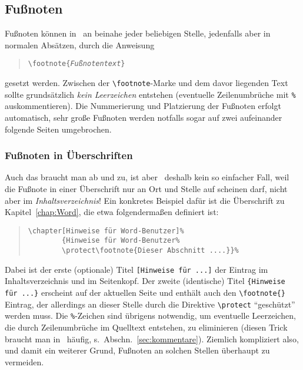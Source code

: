 \subsection{Fußnoten}
Fußnoten können in \latex\ an beinahe jeder beliebigen Stelle,
jedenfalls aber in normalen Absätzen, durch die Anweisung
%
\begin{quote}
\verb!\footnote{!\texttt{\em Fußnotentext}\verb!}!
\end{quote}
%
gesetzt werden. Zwischen der \verb!\footnote!-Marke und dem davor
liegenden Text sollte grundsätzlich \emph{kein Leerzeichen} entstehen (eventuelle
Zeilen\-um\-brüche mit \verb!%! auskommentieren).
Die Nummerierung und Platzierung der Fußnoten
erfolgt automatisch, sehr große Fußnoten werden notfalls sogar auf
zwei aufeinander folgende Seiten umgebrochen.


\subsubsection{Fußnoten in Überschriften}

Auch das braucht man ab und zu, ist aber \va\ deshalb kein so
einfacher Fall, weil die Fußnote in einer Überschrift nur an Ort
und Stelle auf scheinen darf, nicht aber im \emph{Inhaltsverzeichnis}! Ein
konkretes Beispiel dafür ist die Überschrift zu
Kapitel~\ref{chap:Word}, die etwa folgendermaßen definiert ist:
%
\begin{quote}
\begin{verbatim}
\chapter[Hinweise für Word-Benutzer]%
        {Hinweise für Word-Benutzer%
        \protect\footnote{Dieser Abschnitt ....}}%
\end{verbatim}
\end{quote}
%
Dabei ist der erste (optionale) Titel \verb![Hinweise für ...]!
der Eintrag im Inhaltsverzeichnis und im Seitenkopf. 
Der zweite (identische) Titel
\texttt{\{Hinweise für ...\}} erscheint auf der aktuellen Seite und
enthält auch den \verb!\footnote{}! Eintrag, der allerdings an
dieser Stelle durch die Direktive \verb!\protect! "`geschützt"'
werden muss. Die \verb!%!-Zeichen sind übrigens notwendig,
um eventuelle Leerzeichen, die durch Zeilenumbrüche im Quelltext
entstehen, zu eliminieren (diesen Trick braucht man %
in \latex\ häufig, s.\ Abschn.~\ref{sec:kommentare}). 
Ziemlich kompliziert also, und damit 
ein weiterer Grund, Fußnoten an solchen Stellen überhaupt zu vermeiden.

